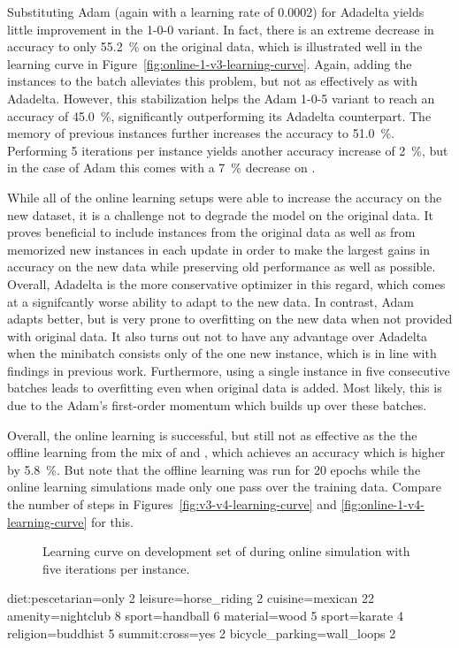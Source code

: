 Substituting Adam (again with a learning rate of \num{0.0002}) for Adadelta
yields little improvement in the 1-0-0 variant. In fact, there is an extreme
decrease in accuracy to only \SI{55.2}{\%} on the original \nlmthree{} data,
which is illustrated well in the learning curve in
Figure~\ref{fig:online-1-v3-learning-curve}. Again, adding the \nlmthree{}
instances to the batch alleviates this problem, but not as effectively as with
Adadelta. However, this stabilization helps the Adam 1-0-5 variant to reach an
\nlmfour{} accuracy of \SI{45.0}{\%}, significantly outperforming its Adadelta
counterpart. The memory of previous \nlmfour{} instances further increases the
accuracy to \SI{51.0}{\%}. Performing 5 iterations per instance yields
another accuracy increase of \SI{2}{\%}, but in the case of Adam this comes with
a \SI{7}{\%} decrease on \nlmthree{}.

While all of the online learning setups were able to increase the accuracy on
the new \nlmapsfour{} dataset, it is a challenge not to degrade the model on the
original data. It proves beneficial to include instances from the original data
as well as from memorized new instances in each update in order to make the
largest gains in accuracy on the new data while preserving old performance as
well as possible. Overall, Adadelta is the more conservative optimizer in this
regard, which comes at a signifcantly worse ability to adapt to the new data. In
contrast, Adam adapts better, but is very prone to overfitting on the new data
when not provided with original data. It also turns out not to have any
advantage over Adadelta when the minibatch consists only of the one new
instance, which is in line with findings in previous work. Furthermore, using a
single instance in five consecutive batches leads to overfitting even when
original data is added. Most likely, this is due to the Adam’s first-order
momentum which builds up over these batches.

Overall, the online learning is successful, but still not as effective as the
the offline learning from the mix of \nlmthree{} and \nlmfour{}, which achieves
an accuracy which is higher by \SI{5.8}{\%}. But note that the offline learning
was run for \num{20} epochs while the online learning simulations made only one
pass over the training data. Compare the number of steps in
Figures~\ref{fig:v3-v4-learning-curve} and \ref{fig:online-1-v4-learning-curve}
for this.

\begin{figure}[h]
  \centering
  \resizebox{\textwidth}{!}{}
  \caption{Learning curve on development set of \nlmapsfour{} during online
    simulation with five iterations per instance.}
  \label{fig:online-5-v4-learning-curve}
\end{figure}

diet:pescetarian=only   2
leisure=horse_riding    2
cuisine=mexican 22
amenity=nightclub       8
sport=handball  6
material=wood   5
sport=karate    4
religion=buddhist       5
summit:cross=yes        2
bicycle_parking=wall_loops      2

